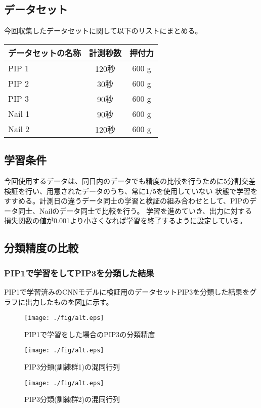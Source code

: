 	\subsection{データセット}
		今回収集したデータセットに関して以下のリストにまとめる。
		\begin{table}[htb]
			\begin{center}
			\begin{tabular}{|l||c| c | }\hline
				データセットの名称&計測秒数 & 押付力\\ \hline \hline
				PIP 1 & 120秒&600 g\\ \hline
				PIP 2 & 30秒&600 g\\ \hline
				PIP 3 & 90秒&600 g\\ \hline
				Nail 1 & 90秒&600 g\\ \hline
				Nail 2 & 120秒&600 g\\ \hline
			\end{tabular}
		\end{center}
		\end{table}
	\subsection{学習条件}
		今回使用するデータは、同日内のデータでも精度の比較を行うために5分割交差検証を行い、用意されたデータのうち、常に1/5を使用していない
		状態で学習をすすめる。計測日の違うデータ同士の学習と検証の組み合わせとして、PIPのデータ同士、Nailのデータ同士で比較を行う。
		学習を進めていき、出力に対する損失関数の値が0.001より小さくなれば学習を終了するように設定している。
		
	\subsection{分類精度の比較}
		\subsubsection{PIP1で学習をしてPIP3を分類した結果}
		PIP1で学習済みのCNNモデルに検証用のデータセットPIP3を分類した結果をグラフに出力したものを図\ref{fig:3_1}に示す。
		\begin{figure}[htbp]
			\begin{center}
			  \texttt{[image: ./fig/alt.eps]}
			  \caption{PIP1で学習をした場合のPIP3の分類精度}
			  \label{fig:3_1}
			\end{center}
		\end{figure}

		\begin{figure}[htbp]
			\begin{center}
			  \texttt{[image: ./fig/alt.eps]}
			  \caption{PIP3分類(訓練群1)の混同行列}
			  \label{fig:3_2}
			\end{center}
		\end{figure}
		\begin{figure}[htbp]
			\begin{center}
			  \texttt{[image: ./fig/alt.eps]}
			  \caption{PIP3分類(訓練群2)の混同行列}
			  \label{fig:3_2}
			\end{center}
		\end{figure}

